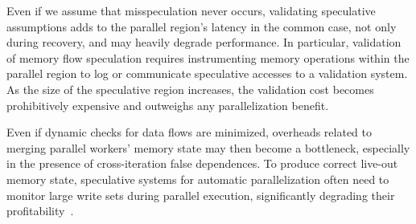 Even if we assume that misspeculation never occurs, validating speculative
assumptions adds to the parallel region's latency in the common case, not only
during recovery, and may heavily degrade performance.
%
In particular, validation of memory flow speculation requires instrumenting
memory operations within the parallel region to log or communicate speculative
accesses to a validation system. As the size of the speculative region
increases, the validation cost becomes prohibitively expensive and outweighs any
parallelization benefit.
%

Even if dynamic checks for data flows are minimized, overheads related to
merging parallel workers' memory state
may then become a bottleneck,
%
especially in the presence of cross-iteration false dependences.
%
To produce correct live-out memory state, speculative systems for automatic
parallelization often need to monitor large write sets during parallel
execution, significantly degrading their profitability~\cite{johnson:12:pldi}.
%
%
%
%

%
%

